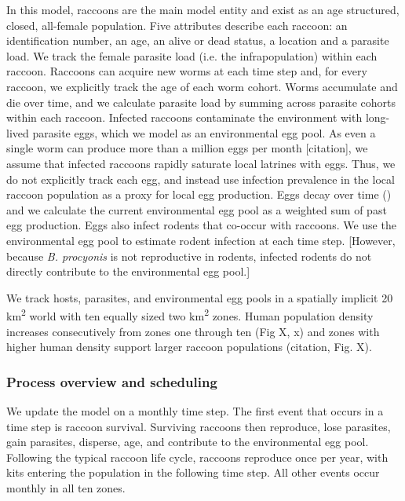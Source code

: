 \documentclass[11pt]{article}
\begin{document}
In this model, raccoons are the main model entity and exist as an age
structured, closed, all-female population. Five attributes describe each raccoon: an identification number, an age, an alive
or dead status, a location and a parasite load. We track the female parasite
load (i.e. the infrapopulation) within each raccoon. Raccoons can acquire new
worms at each time step and, for every raccoon, we explicitly track the age of each
worm cohort. Worms accumulate and die over time, and we
calculate parasite load by summing across parasite cohorts within each raccoon.
Infected raccoons contaminate the environment with long-lived parasite
eggs, which we model as an environmental egg pool. As even a single worm
can produce more than a million eggs per month [citation], we assume that infected
raccoons rapidly saturate local latrines with eggs. Thus, we do not
explicitly track each egg, and instead use infection prevalence in the
local raccoon population as a proxy for local egg production. Eggs decay
over time () and we calculate the current environmental egg pool as a
weighted sum of past egg production. Eggs also infect rodents that co-occur with raccoons. We use the
environmental egg pool to estimate rodent infection at each time step. [However, because \emph{B. procyonis} is not reproductive in rodents, infected rodents do not directly contribute to the environmental egg pool.]

We track hosts, parasites, and environmental egg pools in a spatially
implicit 20 km\textsuperscript{2} world with ten equally sized two
km\textsuperscript{2} zones. Human population density increases
consecutively from zones one through ten (Fig X, x) and zones with
higher human density support larger raccoon populations (citation, Fig. X). 


\subsubsection{Process overview and scheduling}

We update the model on a monthly time step. The first event that occurs in a time step is raccoon survival. Surviving raccoons then reproduce, lose
parasites, gain parasites, disperse, age, and contribute to the
environmental egg pool. Following the typical raccoon life cycle,
raccoons reproduce once per year, with kits entering the population in
the following time step. All other events occur monthly in all ten
zones.
\end{document}
